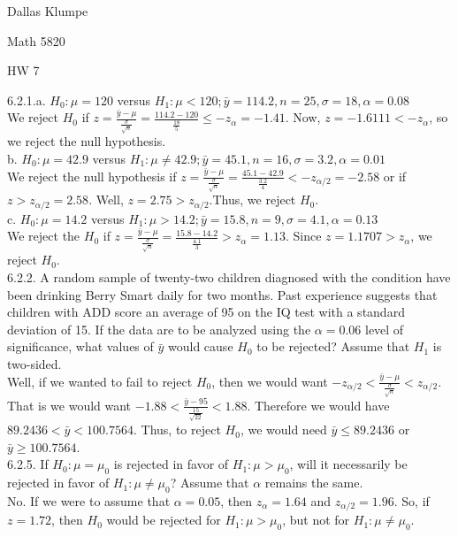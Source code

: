 \documentclass[12pt]{article}
\begin{document}
\noindent Dallas Klumpe

\noindent Math 5820

\noindent HW 7

6.2.1.a. $H_0:\mu=120$ versus $H_1:\mu<120; \bar{y}=114.2, n = 25, \sigma=18, \alpha=0.08$\\
We reject $H_0$ if $z=\frac{\bar{y}-\mu}{\frac{\sigma}{\sqrt{n}}}=\frac{114.2-120}{\frac{18}{5}}\leq -z_{\alpha}=-1.41$. Now, $z=-1.6111<-z_{\alpha}$, so we reject the null hypothesis.\\
b. $H_0:\mu=42.9$ versus $H_1:\mu\neq42.9; \bar{y}=45.1, n=16, \sigma=3.2, \alpha=0.01$\\
We reject the null hypothesis if $z=\frac{\bar{y}-\mu}{\frac{\sigma}{\sqrt{n}}}=\frac{45.1-42.9}{\frac{3.2}{4}}<-z_{\alpha/2}=-2.58$ or if $z>z_{\alpha/2}=2.58$. Well, $z=2.75>z_{\alpha/2}$.Thus, we reject $H_0$.\\
c. $H_0:\mu=14.2$ versus $H_1:\mu>14.2; \bar{y}=15.8, n=9, \sigma=4.1, \alpha=0.13$\\
We reject the $H_0$ if $z=\frac{\bar{y}-\mu}{\frac{\sigma}{\sqrt{n}}}=\frac{15.8-14.2}{\frac{4.1}{3}}>z_{\alpha}=1.13$. Since $z=1.1707>z_{\alpha}$, we reject $H_0$.\\[20pt]

6.2.2. A random sample of twenty-two children diagnosed with the condition have been drinking Berry Smart daily for two months. Past experience suggests that children with ADD score an average of 95 on the IQ test with a standard deviation of 15. If the data are to be analyzed using the $\alpha=0.06$ level of significance, what values of $\bar{y}$ would cause $H_0$ to be rejected? Assume that $H_1$ is two-sided.\\
Well, if we wanted to fail to reject $H_0$, then we would want $-z_{\alpha/2}<\frac{\bar{y}-\mu}{\frac{\sigma}{\sqrt{n}}}<z_{\alpha/2}$. That is we would want $-1.88<\frac{\bar{y}-95}{\frac{15}{\sqrt{22}}}<1.88$. Therefore we would have $89.2436<\bar{y}<100.7564$. Thus, to reject $H_0$, we would need $\bar{y}\leq89.2436$ or $\bar{y}\geq100.7564$.\\[20pt]

6.2.5. If $H_0:\mu=\mu_0$ is rejected in favor of $H_1:\mu>\mu_0$, will it necessarily be rejected in favor of $H_1:\mu\neq\mu_0$? Assume that $\alpha$ remains the same.\\
No. If we were to assume that $\alpha=0.05$, then $z_{\alpha}=1.64$ and $z_{\alpha/2}=1.96$. So, if $z=1.72$, then $H_0$ would be rejected for $H_1:\mu>\mu_0$, but not for $H_1:\mu\neq\mu_0$.\\[20pt]
\end{document}
